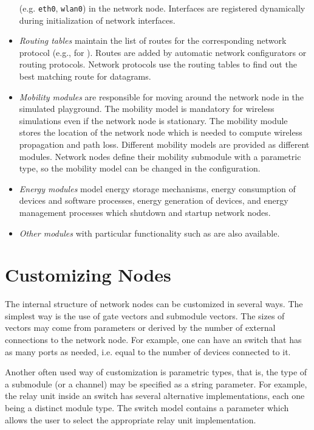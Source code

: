 \begin{itemize}
     (e.g. \texttt{eth0}, \texttt{wlan0}) in the network node. Interfaces
     are registered dynamically during initialization of network interfaces.
  \item \emph{Routing tables} maintain the list of routes for the corresponding
     network protocol (e.g.,  for ).
     Routes are added by automatic network configurators or routing protocols.
     Network protocols use the routing tables to find out the best matching
     route for datagrams.
  \item \emph{Mobility modules} are responsible for moving around the network
     node in the simulated playground. The mobility model is mandatory for
     wireless simulations even if the network node is stationary. The mobility
     module stores the location of the network node which is needed to compute
     wireless propagation and path loss. Different mobility models are provided
     as different modules. Network nodes define their mobility submodule with
     a parametric type, so the mobility model can be changed in the configuration.
  \item \emph{Energy modules} model energy storage mechanisms, energy
     consumption of devices and software processes, energy generation of devices,
     and energy management processes which shutdown and startup network nodes.
  \item \emph{Other modules} with particular functionality such as
      are also available.
\end{itemize}

\section{Customizing Nodes}

The internal structure of network nodes can be customized in several ways.
The simplest way is the use of gate vectors and submodule vectors. The
sizes of vectors may come from parameters or derived by the number of
external connections to the network node. For example, one can have an
 switch that has as many ports as needed, i.e. equal to
the number of  devices connected to it.

Another often used way of customization is parametric types, that is, the
type of a submodule (or a channel) may be specified as a string parameter.
For example, the relay unit inside an  switch has
several alternative implementations, each one being a distinct module type.
The switch model contains a parameter which allows the user to select the
appropriate relay unit implementation.

